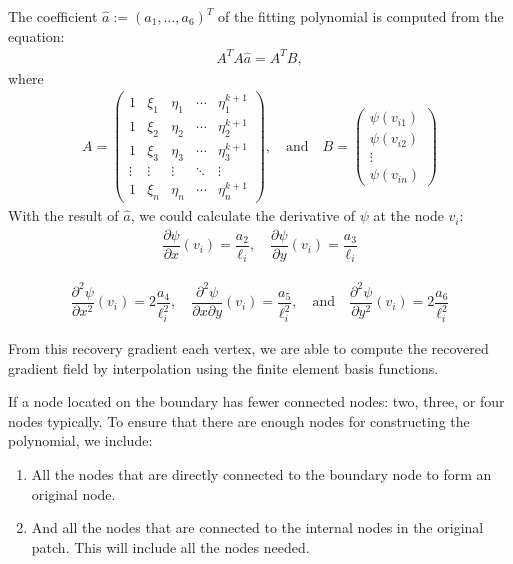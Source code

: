 \documentclass[12pt]{book}
\theoremstyle{bfnote}
\theoremstyle{bfnote}
\begin{document}
The coefficient $\hat{a} := (a_1, \ldots, a_6)^T$ of the fitting polynomial is computed from the equation:
\begin{align}
    A^T A \hat{a} = A^T B,
\end{align}
where
\begin{align*}
    A = \begin{pmatrix}
        1 & \xi_1 & \eta_1 & \cdots & \eta_1^{k+1} \\
        1 & \xi_2 & \eta_2 & \cdots & \eta_2^{k+1} \\
        1 & \xi_3 & \eta_3 & \cdots & \eta_3^{k+1} \\
        \vdots & \vdots & \vdots & \ddots & \vdots \\
        1 & \xi_n & \eta_n & \cdots & \eta_n^{k+1}
    \end{pmatrix},
    \quad \text{and} \quad
    B = \begin{pmatrix}
        \psi(v_{i1}) \\
        \psi(v_{i2}) \\
        \vdots \\
        \psi(v_{in})
    \end{pmatrix}
\end{align*}
With the result of $\hat{a}$, we could calculate the derivative of $\psi$ at the node $v_i$:
\begin{align*}
    \dfrac{\partial \psi}{\partial x} (v_i) = \dfrac{a_2}{\ell_i}, \quad \dfrac{\partial \psi}{\partial y} (v_i) = \dfrac{a_3}{\ell_i}
\end{align*}

\begin{align*}
    \dfrac{\partial^2 \psi}{\partial x^2} (v_i) = 2\dfrac{a_4}{\ell_i^2}, \quad \dfrac{\partial^2 \psi}{\partial x \partial y} (v_i) = \dfrac{a_5}{\ell_i^2}, \quad \text{and} \quad \dfrac{\partial^2 \psi}{\partial y^2} (v_i) = 2\dfrac{a_6}{\ell_i^2}
\end{align*}

From this recovery gradient each vertex, we are able to compute the recovered gradient field by interpolation using the finite element basis functions.

If a node located on the boundary has fewer connected nodes: two, three, or four nodes typically. To ensure that there are enough nodes for constructing the polynomial, we include:
\begin{enumerate}
    \item All the nodes that are directly connected to the boundary node to form an original node.
    \item And all the nodes that are connected to the internal nodes in the original patch. This will include all the nodes needed.
\end{enumerate}
\end{document}
